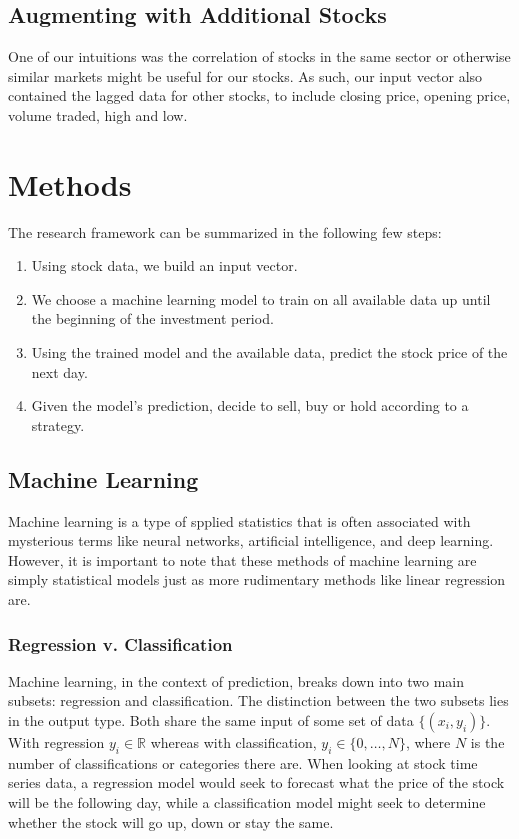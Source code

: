 \documentclass[12pt]{article}
\begin{document}
\subsection{Augmenting with Additional Stocks}
One of our intuitions was the correlation of stocks in the same sector or otherwise similar markets might be useful for our stocks. As such, our input vector also contained the lagged data for other stocks, to include closing price, opening price, volume traded, high and low.

\section{Methods}
The research framework can be summarized in the following few steps:
\begin{enumerate}
	\item Using stock data, we build an input vector.
	\item We choose a machine learning model to train on all available data up until the beginning of the investment period.
	\item Using the trained model and the available data, predict the stock price of the next day.
	\item Given the model's prediction, decide to sell, buy or hold according to a strategy.
\end{enumerate}

\subsection{Machine Learning} 
Machine learning is a type of spplied statistics that is often associated with mysterious terms like neural networks, artificial intelligence, and deep learning. However, it is important to note that these methods of machine learning are simply statistical models just as more rudimentary methods like linear regression are.

\subsubsection{Regression v. Classification}
Machine learning, in the context of prediction, breaks down into two main subsets: regression and classification. The distinction between the two subsets lies in the output type. Both share the same input of some set of data $\{(x_i, y_i)\}$. With regression $y_i \in \mathbb{R}$ whereas with classification, $y_i \in \{0,\dots,N\}$, where $N$ is the number of classifications or categories there are.  \cite[9-10]{springer} When looking at stock time series data, a regression model would seek to forecast what the price of the stock will be the following day, while a classification model might seek to determine whether the stock will go up, down or stay the same. 
\end{document}
